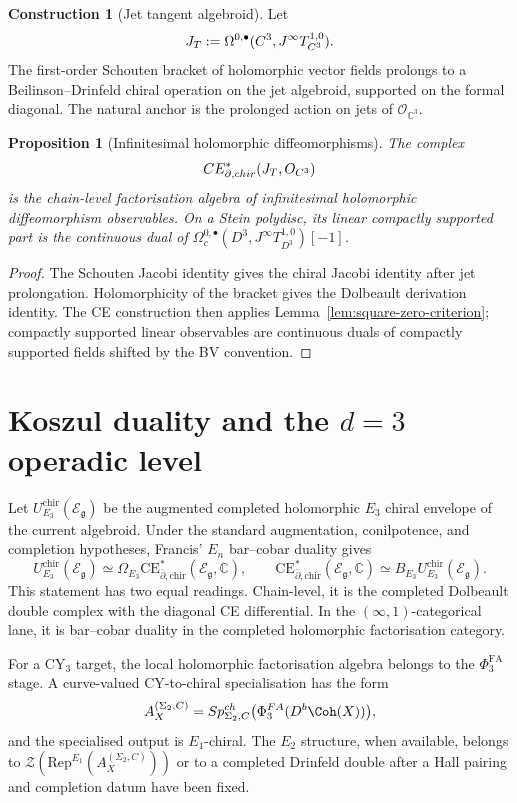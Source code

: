 \documentclass[11pt]{amsart}
\providecommand{\C}{\mathbb{C}}
\providecommand{\dbar}{\bar{\partial}}
\providecommand{\g}{\mathfrak{g}}
\providecommand{\CE}{\mathrm{CE}}
\providecommand{\chir}{\mathrm{chir}}
\providecommand{\Rep}{\mathrm{Rep}}
\providecommand{\cE}{\mathcal{E}}
\providecommand{\cO}{\mathcal{O}}
\providecommand{\cT}{\mathcal{T}}
\providecommand{\cZ}{\mathcal{Z}}
\providecommand{\PhiFA}{\Phi^{\mathrm{FA}}}
\providecommand{\SpCh}{\mathrm{Sp}^{\mathrm{ch}}}
\theoremstyle{plain}
\newtheorem{proposition}[theorem]{Proposition}
\theoremstyle{definition}
\newtheorem{construction}[theorem]{Construction}
\theoremstyle{remark}
\begin{document}
\begin{construction}[Jet tangent algebroid]\label{con:jet-tangent}
Let
\[
  \cJ_{\cT}:=\Omega^{0,\bullet}(\C^3,J^\infty T^{1,0}_{\C^3}).
\]
The first-order Schouten bracket of holomorphic vector fields prolongs
to a Beilinson--Drinfeld chiral operation on the jet algebroid, supported
on the formal diagonal. The natural anchor is the prolonged action on
jets of $\cO_{\C^3}$.
\end{construction}

\begin{proposition}[Infinitesimal holomorphic diffeomorphisms]
\label{prop:tangent-jet-ce}
The complex
\[
  \CE^*_{\dbar,\chir}(\cJ_{\cT},\cO_{\C^3})
\]
is the chain-level factorisation algebra of infinitesimal holomorphic
diffeomorphism observables. On a Stein polydisc, its linear compactly
supported part is the continuous dual of
$\Omega^{0,\bullet}_c(D^3,J^\infty T^{1,0}_{D^3})[-1]$.
\end{proposition}

\begin{proof}
The Schouten Jacobi identity gives the chiral Jacobi identity after jet
prolongation. Holomorphicity of the bracket gives the Dolbeault
derivation identity. The CE construction then applies
Lemma~\ref{lem:square-zero-criterion}; compactly supported linear
observables are continuous duals of compactly supported fields shifted by
the BV convention.
\end{proof}

\section{Koszul duality and the \texorpdfstring{$d=3$}{d=3} operadic level}
Let $U^{\chir}_{E_3}(\cE_{\g})$ be the augmented completed holomorphic
$E_3$ chiral envelope of the current algebroid. Under the standard
augmentation, conilpotence, and completion hypotheses, Francis'
$E_n$ bar--cobar duality gives
\[
  U^{\chir}_{E_3}(\cE_{\g})
  \simeq
  \Omega_{E_3}\CE^*_{\dbar,\chir}(\cE_{\g},\C),
  \qquad
  \CE^*_{\dbar,\chir}(\cE_{\g},\C)
  \simeq
  B_{E_3}U^{\chir}_{E_3}(\cE_{\g}).
\]
This statement has two equal readings. Chain-level, it is the completed
Dolbeault double complex with the diagonal CE differential. In the
$(\infty,1)$-categorical lane, it is bar--cobar duality in the completed
holomorphic factorisation category.

For a CY$_3$ target, the local holomorphic factorisation algebra belongs
to the $\PhiFA_3$ stage. A curve-valued CY-to-chiral specialisation has
the form
\[
  A_X^{(\Sigma_2,C)}
  =
  \SpCh_{\Sigma_2,C}\bigl(\PhiFA_3(D^b\Coh(X))\bigr),
\]
and the specialised output is $E_1$-chiral. The $E_2$ structure, when
available, belongs to $\cZ(\Rep^{E_1}(A_X^{(\Sigma_2,C)}))$ or to a
completed Drinfeld double after a Hall pairing and completion datum have
been fixed.
\end{document}

